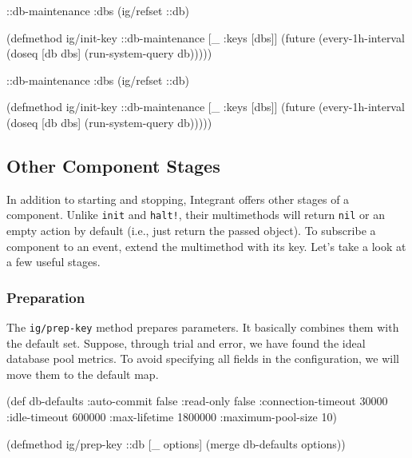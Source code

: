 \ifnarrow

\begin{english}
  \begin{clojure}
{::db-maintenance
 {:dbs (ig/refset ::db)}}

(defmethod ig/init-key ::db-maintenance
  [_ {:keys [dbs]}]
  (future
    (every-1h-interval
      (doseq [db dbs]
        (run-system-query db)))))
  \end{clojure}
\end{english}

\else

\begin{english}
  \begin{clojure}
{::db-maintenance {:dbs (ig/refset ::db)}}

(defmethod ig/init-key ::db-maintenance
  [_ {:keys [dbs]}]
  (future
    (every-1h-interval
      (doseq [db dbs]
        (run-system-query db)))))
  \end{clojure}
\end{english}

\fi

\subsection{Other Component Stages}


In addition to starting and stopping, Integrant offers other stages of a component. Unlike \verb|init| and \verb|halt!|, their multimethods will return \verb|nil| or an empty action by default (i.e., just return the passed object). To subscribe a component to an event, extend the multimethod with its key. Let's take a look at a few useful stages.

\subsubsection{Preparation}

The \verb|ig/prep-key| method prepares parameters. It basically combines them with the default set. Suppose, through trial and error, we have found the ideal database pool metrics. To avoid specifying all fields in the configuration, we will move them to the default map.

\begin{english}
  \begin{clojure}
(def db-defaults
  {:auto-commit        false
   :read-only          false
   :connection-timeout 30000
   :idle-timeout       600000
   :max-lifetime       1800000
   :maximum-pool-size  10})

(defmethod ig/prep-key ::db
  [_ options]
  (merge db-defaults options))
  \end{clojure}
\end{english}

